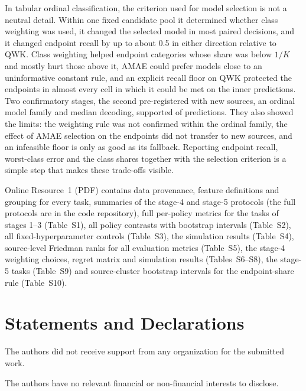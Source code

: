 \documentclass[pdflatex,sn-mathphys-ay]{sn-jnl}
\theoremstyle{thmstyleone}
\theoremstyle{thmstylethree}
\begin{document}
In tabular ordinal classification, the criterion used for model selection is not a neutral detail. Within one fixed candidate pool it determined whether class weighting was used, it changed the selected model in most paired decisions, and it changed endpoint recall by up to about 0.5 in either direction relative to QWK. Class weighting helped endpoint categories whose share was below $1/K$ and mostly hurt those above it, AMAE could prefer models close to an uninformative constant rule, and an explicit recall floor on QWK protected the endpoints in almost every cell in which it could be met on the inner predictions. Two confirmatory stages, the second pre-registered with new sources, an ordinal model family and median decoding, supported \PredAllOk{} of \PredAllN{} predictions. They also showed the limits: the weighting rule was not confirmed within the ordinal family, the effect of AMAE selection on the endpoints did not transfer to new sources, and an infeasible floor is only as good as its fallback. Reporting endpoint recall, worst-class error and the class shares together with the selection criterion is a simple step that makes these trade-offs visible.

\backmatter

Online Resource~1 (PDF) contains data provenance, feature definitions and grouping for every task, summaries of the stage-4 and stage-5 protocols (the full protocols are in the code repository), full per-policy metrics for the tasks of stages 1--3 (Table~S1), all policy contrasts with bootstrap intervals (Table~S2), all fixed-hyperparameter controls (Table~S3), the simulation results (Table~S4), source-level Friedman ranks for all evaluation metrics (Table~S5), the stage-4 weighting choices, regret matrix and simulation results (Tables~S6--S8), the stage-5 tasks (Table~S9) and source-cluster bootstrap intervals for the endpoint-share rule (Table~S10).

\section*{Statements and Declarations}

 The authors did not receive support from any organization for the submitted work.

 The authors have no relevant financial or non-financial interests to disclose.
\end{document}
